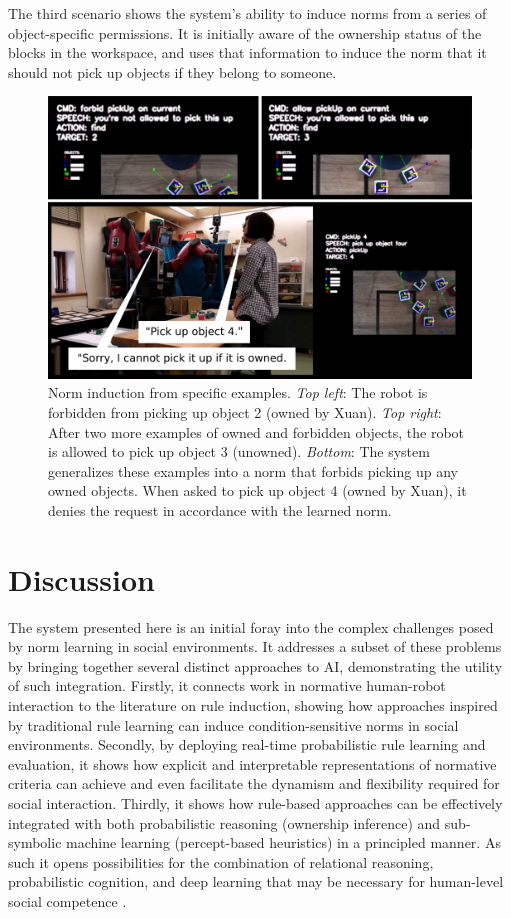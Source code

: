 \documentclass[letterpaper]{article} %
\begin{document}
The third scenario shows the system's ability to induce norms from a series of object-specific permissions. It is initially aware of the ownership status of the blocks in the workspace, and uses that information to induce the norm that it should not pick up objects if they belong to someone.

\begin{figure}[t]
    \centering
    \includegraphics[width=\linewidth]{demo_2.pdf}
    \caption{Norm induction from specific examples. \emph{Top left}: The robot is forbidden from picking up object 2 (owned by Xuan). \emph{Top right}: After two more examples of owned and forbidden objects, the robot is allowed to pick up object 3 (unowned). \emph{Bottom}: The system generalizes these examples into a norm that forbids picking up any owned objects. When asked to pick up object 4 (owned by Xuan), it denies the request in accordance with the learned norm.}
    \label{fig:demo_2}
\end{figure}

\section{Discussion}

The system presented here is an initial foray into the complex challenges posed by norm learning in social environments. It addresses a subset of these problems by bringing together several distinct approaches to AI, demonstrating the utility of such integration. Firstly, it connects work in normative human-robot interaction to the literature on rule induction, showing how approaches inspired by traditional rule learning can induce condition-sensitive norms in social environments. Secondly, by deploying real-time probabilistic rule learning and evaluation, it shows how explicit and interpretable representations of normative criteria can achieve and even facilitate the dynamism and flexibility required for social interaction. Thirdly, it shows how rule-based approaches can be effectively integrated with both probabilistic reasoning (ownership inference) and sub-symbolic machine learning (percept-based heuristics) in a principled manner. As such it opens possibilities for the combination of relational reasoning, probabilistic cognition, and deep learning that may be necessary for human-level social competence \cite{tenenbaum2011grow,battaglia2018relational}.
\end{document}
